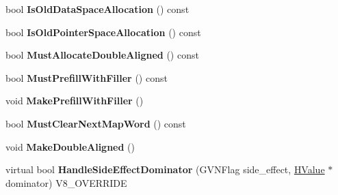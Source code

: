 \begin{DoxyCompactItemize}
\item 
\hypertarget{classv8_1_1internal_1_1_v8___f_i_n_a_l_a3c6a1455256e113c4850f4232985fabc}{}bool {\bfseries Is\+Old\+Data\+Space\+Allocation} () const \label{classv8_1_1internal_1_1_v8___f_i_n_a_l_a3c6a1455256e113c4850f4232985fabc}

\item 
\hypertarget{classv8_1_1internal_1_1_v8___f_i_n_a_l_a225d37b64fbdecdf5f66f7d017285542}{}bool {\bfseries Is\+Old\+Pointer\+Space\+Allocation} () const \label{classv8_1_1internal_1_1_v8___f_i_n_a_l_a225d37b64fbdecdf5f66f7d017285542}

\item 
\hypertarget{classv8_1_1internal_1_1_v8___f_i_n_a_l_a85764cde271164ec352eb7d6b274304f}{}bool {\bfseries Must\+Allocate\+Double\+Aligned} () const \label{classv8_1_1internal_1_1_v8___f_i_n_a_l_a85764cde271164ec352eb7d6b274304f}

\item 
\hypertarget{classv8_1_1internal_1_1_v8___f_i_n_a_l_a822e70bcad7aca3393cd891d51789b0d}{}bool {\bfseries Must\+Prefill\+With\+Filler} () const \label{classv8_1_1internal_1_1_v8___f_i_n_a_l_a822e70bcad7aca3393cd891d51789b0d}

\item 
\hypertarget{classv8_1_1internal_1_1_v8___f_i_n_a_l_afbaadf02925be3d66ffd9a49ba4040e2}{}void {\bfseries Make\+Prefill\+With\+Filler} ()\label{classv8_1_1internal_1_1_v8___f_i_n_a_l_afbaadf02925be3d66ffd9a49ba4040e2}

\item 
\hypertarget{classv8_1_1internal_1_1_v8___f_i_n_a_l_a199af17fed0f9329bb3dd53bc42f4d32}{}bool {\bfseries Must\+Clear\+Next\+Map\+Word} () const \label{classv8_1_1internal_1_1_v8___f_i_n_a_l_a199af17fed0f9329bb3dd53bc42f4d32}

\item 
\hypertarget{classv8_1_1internal_1_1_v8___f_i_n_a_l_aef34140ef638f3336f2c5947d0a1ec25}{}void {\bfseries Make\+Double\+Aligned} ()\label{classv8_1_1internal_1_1_v8___f_i_n_a_l_aef34140ef638f3336f2c5947d0a1ec25}

\item 
\hypertarget{classv8_1_1internal_1_1_v8___f_i_n_a_l_a05c41b70d08a5a1706e2c0520deebb01}{}virtual bool {\bfseries Handle\+Side\+Effect\+Dominator} (G\+V\+N\+Flag side\+\_\+effect, \hyperlink{classv8_1_1internal_1_1_h_value}{H\+Value} $\ast$dominator) V8\+\_\+\+O\+V\+E\+R\+R\+I\+D\+E\label{classv8_1_1internal_1_1_v8___f_i_n_a_l_a05c41b70d08a5a1706e2c0520deebb01}


\end{DoxyCompactItemize}
